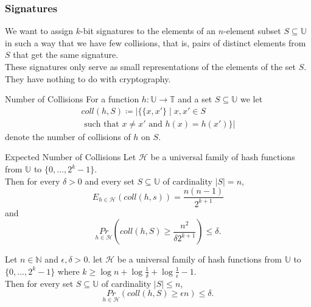 \documentclass[english]{panikzettel}
\begin{document}
\subsubsection{Signatures}
\begin{halfboxl}
\vspace{-\baselineskip}
	We want to assign $k$-bit signatures to the elements of an $n$-element subset $S\subseteq \mathbb{U}$ in such a way that we have few collisions, that is, pairs of distinct elements from $S$ that get the same signature.\\
	These signatures only serve as small representations of the elements of the set $S$. They have nothing to do with cryptography.
\end{halfboxl}
\begin{halfboxr}
\vspace{-\baselineskip}
	\begin{defi}{Number of Collisions}
	For a function $h:\mathbb{U}\to\mathbb{T}$ and a set $S\subseteq \mathbb{U}$ we let
	\begin{multline*}
	coll(h,S)\coloneqq |\{\{x,x'\}\mid x,x'\in S \\
	\text{ such that } x\neq x' \text{ and } h(x)=h(x') \}|
	\end{multline*}
	denote the number of collisions of $h$ on $S$.
	\end{defi}
\end{halfboxr}

\begin{halfboxl}
\vspace{-\baselineskip}
	\begin{theo}{Expected Number of Collisions}
	Let $\mathcal{H}$ be a universal family of hash functions from $\mathbb{U}$ to $\{0,...,2^k-1 \}$. \\
	Then for every $\delta>0$ and every set $S\subseteq \mathbb{U}$ of cardinality $|S|=n$,
	\[
	E_{h\in\mathcal{H}}(coll(h,s))=\frac{n(n-1)}{2^{k+1}}
	\]
	and
	\[
	\underset{h\in\mathcal{H}}{Pr}\left( coll(h,S) \geq \frac{n^2}{\delta 2^{k+1}} \right)\leq \delta.
	\]
	\end{theo}
\end{halfboxl}
\begin{halfboxr}
\vspace{-\baselineskip}
	\begin{theo}{}
	Let $n\in\mathbb{N}$ and $\epsilon, \delta>0$. let $\mathcal{H}$ be a universal family of hash functions from $\mathbb{U}$ to $\{0,...,2^{k}-1\}$ where $k\geq \log n + \log \frac{1}{\delta}+\log \frac{1}{\epsilon}-1$. \\
	Then for every set $S\subseteq \mathbb{U}$ of cardinality $|S| \leq n$,
	\[
	\underset{h\in\mathcal{H}}{Pr}(coll(h,S)\geq \epsilon n)\leq \delta.
	\]
	\end{theo}
\end{halfboxr}
\end{document}
